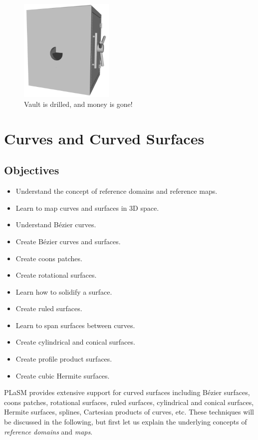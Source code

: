 \documentclass{article}
\begin{document}
\begin{figure}[!ht]
\begin{center}
\includegraphics[width=0.4\textwidth]{img/vault2.png}
\end{center}
\vspace{-4mm}
\caption{Vault is drilled, and money is gone!}
\label{fig:vault2}
\end{figure}
\noindent




\section{Curves and Curved Surfaces}\label{sec:curves}

\subsection{Objectives}
\begin{itemize}
\item Understand the concept of reference domains and reference maps.
\item Learn to map curves and surfaces in 3D space.
\item Understand B\'ezier curves.
\item Create B\'ezier curves and surfaces.
\item Create coons patches.
\item Create rotational surfaces.
\item Learn how to solidify a surface.
\item Create ruled surfaces.
\item Learn to span surfaces between curves.
\item Create cylindrical and conical surfaces.
\item Create profile product surfaces.
\item Create cubic Hermite surfaces.
\end{itemize}
PLaSM provides extensive support for curved surfaces including 
B\'ezier surfaces, coons patches, rotational surfaces, ruled surfaces,  
cylindrical and conical surfaces, Hermite surfaces, 
splines, Cartesian products of curves, etc. These techniques will be 
discussed in the following, but first let us explain the underlying 
concepts of {\em reference domains} and {\em maps}.
\end{document}
